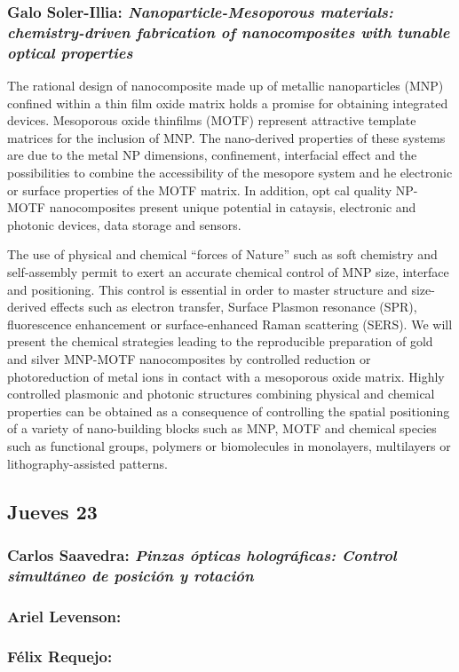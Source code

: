 \subsubsection*{Galo Soler-Illia: \textit{Nanoparticle-Mesoporous materials:
chemistry-driven fabrication of nanocomposites with tunable optical properties}}

The rational design of nanocomposite made up of metallic nanoparticles
(MNP) confined within a thin film oxide matrix holds a promise for obtaining
integrated devices. Mesoporous oxide thinfilms (MOTF) represent attractive
template matrices for the inclusion of MNP. The nano-derived properties of these systems are due to the metal NP dimensions, confinement, interfacial effect
 and the possibilities to combine the accessibility of the mesopore system and 
he electronic or surface properties of the MOTF matrix. In addition,  opt
cal quality NP-MOTF nanocomposites present unique potential in cataysis, electronic and photonic devices, data storage and sensors.              



The use of physical and chemical ``forces of Nature'' such as soft chemistry and
self-assembly permit to exert an accurate chemical control of MNP size,
interface and positioning. This control is essential in order to master
structure and size-derived effects such as electron transfer, Surface Plasmon
resonance (SPR), fluorescence enhancement or surface-enhanced Raman
scattering (SERS). We will present the chemical strategies leading to the
reproducible preparation of gold and silver MNP-MOTF nanocomposites by
controlled reduction or photoreduction of metal ions in contact with a
mesoporous oxide matrix. Highly controlled plasmonic and photonic structures
combining physical and chemical properties can be obtained as a consequence of
controlling the spatial positioning of a variety of nano-building blocks such as
MNP, MOTF and chemical species such as functional groups, polymers or
biomolecules in monolayers, multilayers or lithography-assisted patterns.

\subsection*{Jueves 23}

\subsubsection*{Carlos Saavedra: \textit{Pinzas \'opticas hologr\'aficas:
Control simult\'aneo de posici\'on y rotaci\'on}}

\subsubsection*{Ariel Levenson: }

\subsubsection*{F\'elix Requejo: }